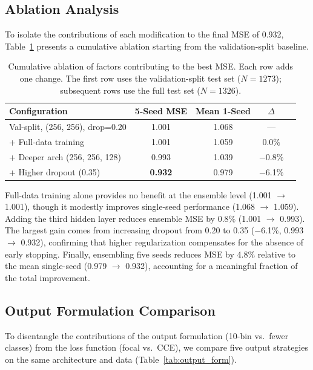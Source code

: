 \documentclass[12pt]{article}
\begin{document}
\subsection{Ablation Analysis}
\label{sec:ablation}

To isolate the contributions of each modification to the final MSE of 0.932, Table~\ref{tab:ablation} presents a cumulative ablation starting from the validation-split baseline.

\begin{table}[H]
\centering
\caption{Cumulative ablation of factors contributing to the best MSE. Each row adds one change. The first row uses the validation-split test set ($N = 1273$); subsequent rows use the full test set ($N = 1326$).}
\label{tab:ablation}
\begin{tabular}{lcccc}
\toprule
Configuration & 5-Seed MSE & Mean 1-Seed & $\Delta$ \\
\midrule
Val-split, (256, 256), drop=0.20 & 1.001 & 1.068 & --- \\
\quad + Full-data training & 1.001 & 1.059 & 0.0\% \\
\quad + Deeper arch (256, 256, 128) & 0.993 & 1.039 & $-$0.8\% \\
\quad + Higher dropout (0.35) & \textbf{0.932} & 0.979 & $-$6.1\% \\
\bottomrule
\end{tabular}
\end{table}

Full-data training alone provides no benefit at the ensemble level (1.001 $\to$ 1.001), though it modestly improves single-seed performance (1.068 $\to$ 1.059).
Adding the third hidden layer reduces ensemble MSE by 0.8\% (1.001 $\to$ 0.993).
The largest gain comes from increasing dropout from 0.20 to 0.35 ($-$6.1\%, 0.993 $\to$ 0.932), confirming that higher regularization compensates for the absence of early stopping.
Finally, ensembling five seeds reduces MSE by 4.8\% relative to the mean single-seed (0.979 $\to$ 0.932), accounting for a meaningful fraction of the total improvement.

\subsection{Output Formulation Comparison}
\label{sec:output_formulation}

To disentangle the contributions of the output formulation (10-bin vs.\ fewer classes) from the loss function (focal vs.\ CCE), we compare five output strategies on the same architecture and data (Table~\ref{tab:output_form}).
\end{document}
